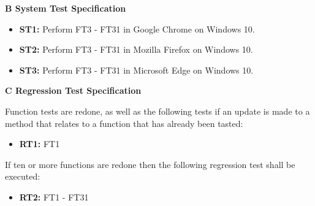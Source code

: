 \documentclass{article}
\begin{document}
		
		\newpage
		\begin{flushleft}
		{\large \textbf{B System Test Specification}}
		\end{flushleft}
		
		
		
		\begin{itemize}
		
  			\item \textbf{ST1:} Perform FT3 - FT31 in Google Chrome on Windows 10. 	
  			
  			\item \textbf{ST2:} Perform FT3 - FT31 in Mozilla Firefox on Windows 10. 
  			
  			\item \textbf{ST3:} Perform FT3 - FT31 in Microsoft Edge on Windows 10. 					
  			
  			
		\end{itemize}
		
		\newpage
		\begin{flushleft}
		{\large \textbf{C Regression Test Specification}}
		\end{flushleft}
			
		\begin{flushleft}
		Function tests are redone, as well as the following tests if an update is made to a method that relates to a function that has already been tasted:
		\end{flushleft}
		
		\begin{itemize}
		
  			\item \textbf{RT1:} FT1
  			
			  					
		\end{itemize}
		
		\begin{flushleft}
			If ten or more functions are redone then the following regression test shall be executed:
			\end{flushleft}	
		
		\begin{itemize}			
  			
  			\item \textbf{RT2:} FT1 - FT31		

		\end{itemize}
		
		
			
		


\end{document}
